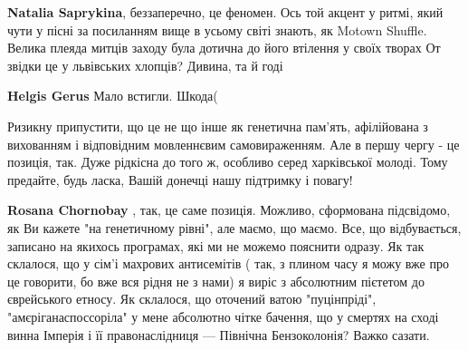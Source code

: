 \begin{itemize}
\textbf{Natalia Saprykina}, беззаперечно, це феномен.
Ось той акцент у ритмі, який чути у пісні за посиланням вище в усьому світі знають, як Motown Shuffle.
Велика плеяда митців заходу була дотична до його втілення у своїх творах
От звідки це у львівських хлопців?
Дивина, та й годі

\begin{itemize} %
 
\textbf{Helgis Gerus} Мало встигли. Шкода(
\end{itemize} %

 

Ризикну припустити, що це не що інше як генетична пам'ять, афілійована з
вихованням і відповідним мовленнєвим самовираженням. Але в першу чергу - це
позиція, так. Дуже рідкісна до того ж, особливо серед харківської молоді. Тому
предайте, будь ласка, Вашій донечці нашу підтримку і повагу!

\begin{itemize} %
 
\textbf{Rosana Chornobay} , так, це саме позиція.
Можливо, сформована підсвідомо, як Ви кажете "на генетичному рівні", але маємо, що маємо.
Все, що відбувається, записано на якихось програмах, які ми не можемо пояснити одразу.
Як так склалося, що у сім'і махрових антисемітів ( так, з плином часу я можу вже про це говорити, бо вже вся рідня не з нами) я виріс з абсолютним пієтетом до єврейського етносу.
Як склалося, що оточений ватою "пуцінпріді", "амєріганаспоссоріла" у мене абсолютно чітке бачення, що у смертях на сході винна Імперія і її правонаслідниця — Північна Бензоколонія?
Важко сазати.
\end{itemize} %

 

\end{itemize}
